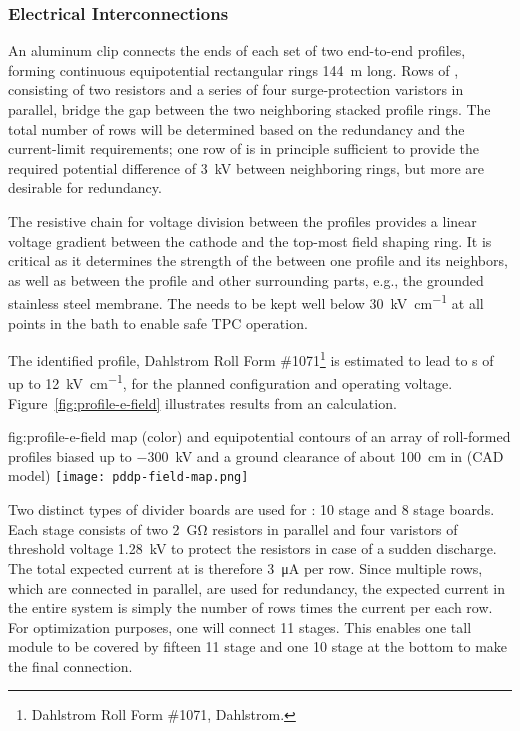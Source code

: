 \subsubsection{Electrical Interconnections}

An aluminum clip connects the ends of each set of two end-to-end  profiles, forming continuous equipotential rectangular rings  \SI{144}{\m} long. 
Rows of , consisting of two resistors and a series of four surge-protection varistors in parallel, bridge the gap between the two neighboring stacked profile rings.   The total number of rows will be determined based on the redundancy and the current-limit requirements;  one row of  is in principle sufficient to provide the required potential difference of \SI{3}{\kV} between neighboring rings, but more are desirable for redundancy.


The resistive chain for voltage division between the profiles provides a linear voltage gradient between the cathode and the top-most field shaping ring. It is critical as it determines the strength of the \efield between one profile and its neighbors, as well as between the profile and other surrounding parts, e.g., the grounded stainless steel membrane. The \efield needs to be kept well below \SI{30}{\kV\per\cm} at all points in the \lar bath to enable safe TPC operation.

The identified profile, Dahlstrom Roll Form \#1071\footnote{Dahlstrom Roll Form \#1071, Dahlstrom\texttrademark{}.}  is estimated to lead to \efield{}s of up to \SI{12}{\kV\per\cm},   
for the planned  configuration and operating voltage. Figure~\ref{fig:profile-e-field} illustrates results from an \efield calculation.


\begin{dunefigure}
{fig:profile-e-field}
{\efield map (color) and equipotential contours of an array of roll-formed profiles biased up to \SI{-300}{\kV} and a ground clearance of about \SI{100}{\cm} in  (CAD model)} 
\texttt{[image: pddp-field-map.png]}
\end{dunefigure}

Two distinct types of  divider boards are used for : \num{10} stage and \num{8} stage boards.  Each stage consists of two \SI{2}{\giga\ohm} resistors in parallel and four varistors of threshold voltage \SI{1.28}{kV} to protect the resistors in case of a sudden discharge.  The total expected current at \dptargetdriftvoltpos is therefore \SI{3}{\micro\ampere} per row.  Since multiple rows, which are connected in parallel, are used for redundancy, the expected current in the entire system is simply the number of rows times the current per each row.
For optimization purposes, one   will connect \num{11} stages.  This enables  one \tpcheight tall module to be covered by fifteen \num{11} stage  and one \num{10} stage  at the bottom to make the final connection.  


